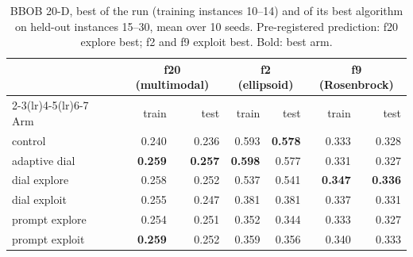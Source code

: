 \begin{table}[t]
  \caption{BBOB 20-D, best \aocc of the run (training instances 10--14)
    and of its best algorithm on held-out instances 15--30, mean over
    10 seeds. Pre-registered prediction: f20 explore best; f2 and f9
    exploit best. Bold: best arm.}
  \label{tab:bbob}
  \small
  \setlength{\tabcolsep}{3.5pt}
  \begin{tabular}{lrrrrrr}
    \toprule
    & \multicolumn{2}{c}{f20 (multimodal)} & \multicolumn{2}{c}{f2
    (ellipsoid)} & \multicolumn{2}{c}{f9 (Rosenbrock)}\\
    \cmidrule(lr){2-3}\cmidrule(lr){4-5}\cmidrule(lr){6-7}
    Arm & train & test & train & test & train & test\\
    \midrule
    control & 0.240 & 0.236 & 0.593 & \textbf{0.578} & 0.333 & 0.328\\
    adaptive dial & \textbf{0.259} & \textbf{0.257} & \textbf{0.598} &
      0.577 & 0.331 & 0.327\\
    dial explore & 0.258 & 0.252 & 0.537 & 0.541 & \textbf{0.347} &
      \textbf{0.336}\\
    dial exploit & 0.255 & 0.247 & 0.381 & 0.381 & 0.337 & 0.331\\
    prompt explore & 0.254 & 0.251 & 0.352 & 0.344 & 0.333 & 0.327\\
    prompt exploit & \textbf{0.259} & 0.252 & 0.359 & 0.356 & 0.340 & 0.333\\
    \bottomrule
  \end{tabular}
\end{table}

